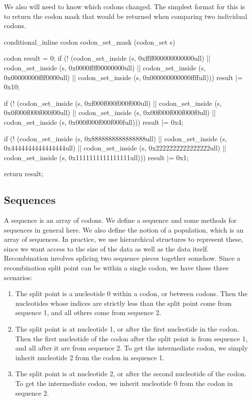\documentclass{article}
\begin{document}
      We also will need to know which codons changed. The simplest format for
      this is to return the codon mask that would be returned when comparing two
      individual codons.

\begin{ccode}
conditional_inline codon codon_set_mask (codon_set s) {
  codon result = 0;
  if (! (codon_set_inside (s, 0xffff000000000000ull) ||
         codon_set_inside (s, 0x0000ffff00000000ull) ||
         codon_set_inside (s, 0x00000000ffff0000ull) ||
         codon_set_inside (s, 0x000000000000ffffull)))
    result |= 0x10;

  if (! (codon_set_inside (s, 0xf000f000f000f000ull) ||
         codon_set_inside (s, 0x0f000f000f000f00ull) ||
         codon_set_inside (s, 0x00f000f000f000f0ull) ||
         codon_set_inside (s, 0x000f000f000f000full)))
    result |= 0x4;

  if (! (codon_set_inside (s, 0x8888888888888888ull) ||
         codon_set_inside (s, 0x4444444444444444ull) ||
         codon_set_inside (s, 0x2222222222222222ull) ||
         codon_set_inside (s, 0x1111111111111111ull)))
    result |= 0x1;

  return result;
}
\end{ccode}

    \subsection{Sequences}
      \label{sec:sequences}
      
      A sequence is an array of codons. We define a sequence and some methods
      for sequences in general here. We also define the notion of a population,
      which is an array of sequences. In practice, we use hierarchical
      structures to represent these, since we want access to the size of the
      data as well as the data itself. Recombination involves splicing two
      sequence pieces together somehow. Since a recombination split point can be
      within a single codon, we have these three scenarios:

      \begin{enumerate}
	\item The split point is a nucleotide 0 within a codon, or between
	codons. Then the nucleotides whose indices are strictly less than the
	split point come from sequence 1, and all others come from sequence 2.

	\item The split point is at nucleotide 1, or after the first nucleotide
	in the codon. Then the first nucleotide of the codon after the split
	point is from sequence 1, and all after it are from sequence 2. To get
	the intermediate codon, we simply inherit nucleotide 2 from the codon in
	sequence 1.

	\item The split point is at nucleotide 2, or after the second nucleotide
	of the codon. To get the intermediate codon, we inherit nucleotide 0
	from the codon in sequence 2.
      \end{enumerate}
\end{document}
